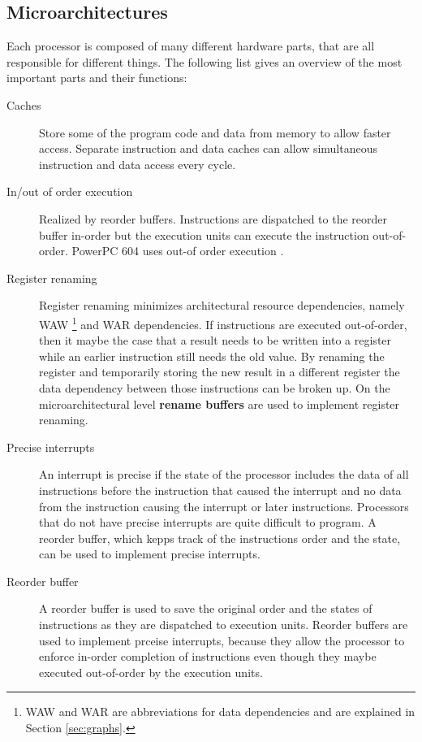 \documentclass[a4paper,10pt]{article}
\begin{document}
\subsection{Microarchitectures}
Each processor is composed of many different hardware parts, that are all responsible for different things. The following list gives an
overview of the most important parts and their functions:
\begin{description}
 \item[Caches] Store some of the program code and data from memory to allow faster access. Separate instruction and data caches
       can allow simultaneous instruction and data access every cycle.
 \item[In/out of order execution] Realized by reorder buffers. Instructions are dispatched to the reorder buffer in-order but
       the execution units can execute the instruction out-of-order. PowerPC 604 uses out-of order execution \cite{powerpc}.
 \item[Register renaming] Register renaming minimizes architectural resource dependencies, namely WAW
       \footnote{\label{footnote-waw}WAW and WAR are abbreviations for data dependencies and are explained in Section \ref{sec:graphs}.}
       and WAR dependencies. If instructions are executed out-of-order, then it maybe the case
       that a result needs to be written into a register while an earlier instruction still needs the old value. By renaming the register
       and temporarily storing the new result in a different register the data dependency between those instructions can be broken up. On
       the microarchitectural level \textbf{rename buffers} are used to implement register renaming.
 \item[Precise interrupts] An interrupt is precise if the state of the processor includes the data of all instructions before
       the instruction that caused the interrupt and no data from the instruction causing the interrupt or later instructions. Processors
       that do not have precise interrupts are quite difficult to program. A reorder buffer, which kepps track of the instructions order
       and the state, can be used to implement precise interrupts\cite{powerpc}.
 \item[Reorder buffer] A reorder buffer is used to save the original order and the states of instructions as they are dispatched
       to execution units. Reorder buffers are used to implement prceise interrupts, because they allow the processor to enforce in-order
       completion of instructions even though they maybe executed out-of-order by the execution units.

\end{description}
\end{document}
